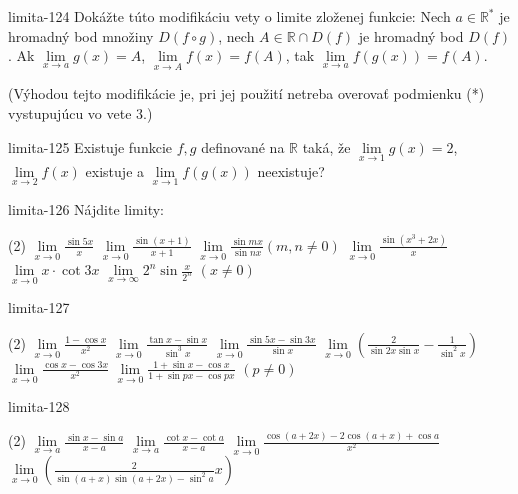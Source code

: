 \begin{defproblem}{limita-124}
Dokážte túto modifikáciu vety o limite zloženej funkcie: Nech $a \in
\mathbb{R^*}$ je hromadný bod množiny $D(f \circ g)$, nech $A \in \mathbb{R}\cap
D(f)$ je hromadný bod $D(f)$. Ak $\lim\limits_{x \rightarrow a} g(x)=A$, $\lim\limits_{x
\rightarrow A} f(x)=f(A)$, tak $\lim\limits_{x \rightarrow a} f(g(x))=f(A)$.

(Výhodou tejto modifikácie je, pri jej použití netreba overovať podmienku (*)
vystupujúcu vo vete $3$.)
\end{defproblem}

\begin{defproblem}{limita-125}
Existuje funkcie $f,g$ definované na $\mathbb{R}$ taká, že $\lim\limits_{x \rightarrow
1} g(x)=2$, $\lim\limits_{x \rightarrow 2} f(x)$ existuje a $\lim\limits_{x \rightarrow 1}
f(g(x))$ neexistuje?
\end{defproblem}

\begin{defproblem}{limita-126}
Nájdite limity:
\begin{tasks}(2)
    \task $\lim\limits_{x \rightarrow 0} \frac{\sin 5x}{x}$
    \task $\lim\limits_{x \rightarrow 0} \frac{\sin (x+1)}{x+1}$
    \task $\lim\limits_{x \rightarrow 0}  \frac{\sin mx}{\sin nx} (m,n \neq 0)$
    \task $\lim\limits_{x \rightarrow 0} \frac{\sin (x^3+2x)}{x}$
    \task $\lim\limits_{x \rightarrow 0} x \cdot \cot 3x$
    \task $\lim\limits_{x \rightarrow \infty} 2^n \sin \frac{x}{2^n}$  $(x \neq 0)$
\end{tasks}
\end{defproblem}

\begin{defproblem}{limita-127}
\begin{tasks}(2)
    \task $\lim\limits_{{x \rightarrow 0}} \frac{1-\cos x}{x^2}$
    \task $\lim\limits_{{x \rightarrow 0}} \frac{\tan x-\sin x}{\sin ^3 x}$
    \task $\lim\limits_{{x \rightarrow 0}}  \frac{\sin 5x-\sin 3x}{\sin x}$
    \task $\lim\limits_{{x \rightarrow 0}} (\frac{2}{\sin 2x \sin x}-\frac{1}{\sin ^2 x})$
    \task $\lim\limits_{{x \rightarrow 0}} \frac{\cos x - \cos 3x}{x^2} $
    \task $\lim\limits_{x \rightarrow 0} \frac{1+\sin x - \cos x}{1+ \sin px - \cos px}$  $(p \neq 0)$
\end{tasks}
\end{defproblem}

\begin{defproblem}{limita-128}
\begin{tasks}(2)
    \task $\lim\limits_{{x \rightarrow a}} \frac{\sin x - \sin a}{x-a}$
    \task $\lim\limits_{{x \rightarrow a}} \frac{\cot x - \cot a}{x-a}$
    \task $\lim\limits_{{x \rightarrow 0}}  \frac{\cos (a+2x)-2 \cos (a+x)+\cos a}{x^2}$
    \task $\lim\limits_{{x \rightarrow 0}} (\frac{2}{\sin (a+x) \sin (a+2x)-\sin ^2 a}{x})$
\end{tasks}
\end{defproblem}

